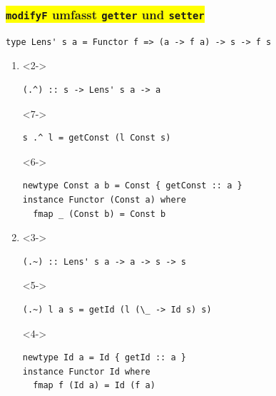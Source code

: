\documentclass{beamer}
\newcommand{\hask}[1]{\texttt{#1}} %
\begin{document}
\begin{frame}[fragile]
  \frametitle{
    \colorbox{yellow}{
      \hask{modifyF} umfasst
       \hask{getter} und
       \hask{setter}
    }
  }

\begin{verbatim}
type Lens' s a = Functor f => (a -> f a) -> s -> f s
\end{verbatim}

  \begin{enumerate}
    \item
    \begin{visibleenv}<2->
\begin{verbatim}
(.^) :: s -> Lens' s a -> a
\end{verbatim}
    \end{visibleenv}
    \vspace{-0.8em}
    \begin{visibleenv}<7->
\begin{verbatim}
s .^ l = getConst (l Const s)
\end{verbatim}
    \end{visibleenv}

    \begin{visibleenv}<6->
\begin{verbatim}
newtype Const a b = Const { getConst :: a }
instance Functor (Const a) where
  fmap _ (Const b) = Const b
\end{verbatim}
    \end{visibleenv}
    \vspace{1em}

    \item
    \begin{visibleenv}<3->
\begin{verbatim}
(.~) :: Lens' s a -> a -> s -> s
\end{verbatim}
    \end{visibleenv}
    \vspace{-0.8em}
    \begin{visibleenv}<5->
\begin{verbatim}
(.~) l a s = getId (l (\_ -> Id s) s)
\end{verbatim}
    \end{visibleenv}

    \begin{visibleenv}<4->
\begin{verbatim}
newtype Id a = Id { getId :: a }
instance Functor Id where
  fmap f (Id a) = Id (f a)
\end{verbatim}
    \end{visibleenv}
  \end{enumerate}
\end{frame}
\end{document}
